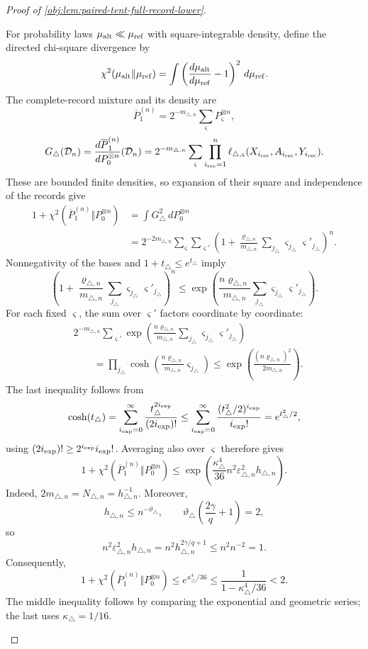 \documentclass[11pt]{article}
\begin{document}
\begin{proof}[Proof of \cref{obj:lem:paired-tent-full-record-lower}]
\begin{enumerate}
For probability laws \(\mu_{\rm alt}\ll\mu_{\rm ref}\) with square-integrable
density, define the directed chi-square divergence by
\[
\chi^2(\mu_{\rm alt}\Vert\mu_{\rm ref})
=
\int
\left(\frac{d\mu_{\rm alt}}{d\mu_{\rm ref}}-1\right)^2
\,d\mu_{\rm ref}.
\]
The complete-record mixture and its density are
\[
\overline P_1^{(n)}
=
2^{-m_{\triangle,n}}\sum_\varsigma P_\varsigma^{\otimes n},
\]
\[
G_\triangle(\mathcal D_n)
=
\frac{d\overline P_1^{(n)}}{dP_0^{\otimes n}}(\mathcal D_n)
=
2^{-m_{\triangle,n}}\sum_\varsigma
\prod_{i_{\rm rec}=1}^n
\ell_{\triangle,\varsigma}(X_{i_{\rm rec}},A_{i_{\rm rec}},Y_{i_{\rm rec}}).
\]
These are bounded finite densities, so expansion of their square and
independence of the records give
\[
\begin{aligned}
1+\chi^2(\overline P_1^{(n)}\Vert P_0^{\otimes n})
&=\int G_\triangle^2\,dP_0^{\otimes n}\\
&=
2^{-2m_{\triangle,n}}
\sum_\varsigma\sum_{\varsigma'}
\left(
1+\frac{\varrho_{\triangle,n}}{m_{\triangle,n}}
\sum_{j_\triangle}\varsigma_{j_\triangle}\varsigma'_{j_\triangle}
\right)^n.
\end{aligned}
\]
Nonnegativity of the bases and \(1+t_\triangle\le e^{t_\triangle}\) imply
\[
\left(
1+\frac{\varrho_{\triangle,n}}{m_{\triangle,n}}
\sum_{j_\triangle}\varsigma_{j_\triangle}\varsigma'_{j_\triangle}
\right)^n
\le
\exp\left(
\frac{n\varrho_{\triangle,n}}{m_{\triangle,n}}
\sum_{j_\triangle}\varsigma_{j_\triangle}\varsigma'_{j_\triangle}
\right).
\]
For each fixed \(\varsigma\), the sum over \(\varsigma'\) factors coordinate
by coordinate:
\[
\begin{aligned}
&2^{-m_{\triangle,n}}\sum_{\varsigma'}
\exp\left(
\frac{n\varrho_{\triangle,n}}{m_{\triangle,n}}
\sum_{j_\triangle}\varsigma_{j_\triangle}\varsigma'_{j_\triangle}
\right)\\
&\qquad=
\prod_{j_\triangle}
\cosh\left(
\frac{n\varrho_{\triangle,n}}{m_{\triangle,n}}\varsigma_{j_\triangle}
\right)
\le
\exp\left(\frac{(n\varrho_{\triangle,n})^2}{2m_{\triangle,n}}\right).
\end{aligned}
\]
The last inequality follows from
\[
\cosh(t_\triangle)
=
\sum_{i_{\rm exp}=0}^{\infty}
\frac{t_\triangle^{2i_{\rm exp}}}{(2i_{\rm exp})!}
\le
\sum_{i_{\rm exp}=0}^{\infty}
\frac{(t_\triangle^2/2)^{i_{\rm exp}}}{i_{\rm exp}!}
=e^{t_\triangle^2/2},
\]
using \((2i_{\rm exp})!\ge2^{i_{\rm exp}}i_{\rm exp}!\).
Averaging also over \(\varsigma\) therefore gives
\[
1+\chi^2(\overline P_1^{(n)}\Vert P_0^{\otimes n})
\le
\exp\left(
\frac{\kappa_\triangle^4}{36}
n^2\varepsilon_{\triangle,n}^2h_{\triangle,n}
\right).
\]
Indeed, \(2m_{\triangle,n}=N_{\triangle,n}=h_{\triangle,n}^{-1}\).
Moreover,
\[
h_{\triangle,n}\le n^{-\vartheta_\triangle},
\qquad
\vartheta_\triangle\left(\frac{2\gamma}{q}+1\right)=2,
\]
so
\[
n^2\varepsilon_{\triangle,n}^2h_{\triangle,n}
=
n^2h_{\triangle,n}^{2\gamma/q+1}
\le n^2n^{-2}=1.
\]
Consequently,
\[
1+\chi^2(\overline P_1^{(n)}\Vert P_0^{\otimes n})
\le e^{\kappa_\triangle^4/36}
\le\frac1{1-\kappa_\triangle^4/36}<2.
\]
The middle inequality follows by comparing the exponential and geometric
series; the last uses \(\kappa_\triangle=1/16\).


\end{enumerate}
\end{proof}
\end{document}
